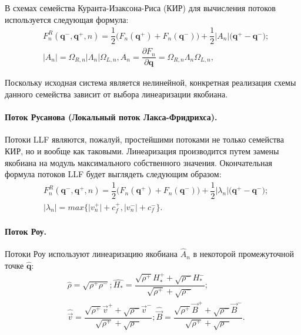 \documentclass[14pt, a4paper, fleqn]{extreport}
\begin{document}
	В схемах семейства Куранта-Изаксона-Риса (КИР) 
	для вычисления потоков используется следующая формула:
	\begin{equation*}
	\begin{split}
		&F_{n}^R(\textbf{q}^{-},\textbf{q}^{+},n) 
			= \dfrac{1}{2}\Big( F_n(\textbf{q}^{+}) + F_n(\textbf{q}^{-}) \Big)
			+ \dfrac{1}{2}\big|A_n\big| \Big( \textbf{q}^{+} - \textbf{q}^{-} \Big); \\
		&\big|A_n\big| = \Omega_{R,n}\big|\Lambda_{n}\big|\Omega_{L,n},
		 A_n = \dfrac{\partial F_n}{\partial \textbf{q}} = \Omega_{R,n}\Lambda_{n}\Omega_{L,n},
	\end{split}
	\end{equation*}
	
	Поскольку исходная система является нелинейной, 
	конкретная реализация схемы данного семейства зависит от выбора линеаризации якобиана.
	
	\paragraph{Поток Русанова (Локальный поток Лакса-Фридрихса).}
	
	Потоки LLF являются, пожалуй, простейшими потоками не только семейства КИР, но 
	и вообще как таковыми.
	Линеаризация производится путем замены якобиана на модуль максимального собственного значения.
	Окончательная формула потоков LLF будет выглядеть следующим образом:
	\begin{equation*}
	\begin{split}
		&F_{n}^R(\textbf{q}^{-},\textbf{q}^{+},n) 
			= \dfrac{1}{2}\Big( F_n(\textbf{q}^{+}) + F_n(\textbf{q}^{-}) \Big)
			+ \dfrac{1}{2}\big|\lambda_n\big| \Big( \textbf{q}^{+} - \textbf{q}^{-} \Big); \\
		&\big|\lambda_n\big| = max\Big\lbrace \big|v^{+}_n\big|+c^{+}_f, \big|v^{-}_n\big|+c^{-}_f \Big\rbrace.
	\end{split}
	\end{equation*}

	\paragraph{Поток Роу.}
	
	Потоки Роу используют линеаризацию якобиана $\hat{A}_n$ в некоторой промежуточной точке $\hat{\textbf{q}}$:
	\begin{equation*}
	\begin{split}
		&\hat{\rho} = \sqrt{\rho^{+}\rho^{-}};
		 \hat{H_*} = \dfrac{\sqrt{\rho^{+}}H_*^{+} + 
						    \sqrt{\rho^{-}}H_*^{-}}{\sqrt{\rho^{+}} + \sqrt{\rho^{-}}}; \\
		&\hat{\vec{v}} = \dfrac{\sqrt{\rho^{+}}\vec{v}^{+} + 
			                    \sqrt{\rho^{-}}\vec{v}^{-}}{\sqrt{\rho^{+}} + \sqrt{\rho^{-}}};
		 \hat{\vec{B}} = \dfrac{\sqrt{\rho^{+}}\vec{B}^{+} + 
							    \sqrt{\rho^{-}}\vec{B}^{-}}{\sqrt{\rho^{+}} + \sqrt{\rho^{-}}}.
	\end{split}
	\end{equation*}
	
\end{document}
